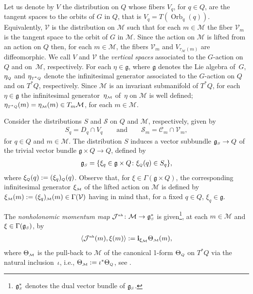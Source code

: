 \documentclass[10pt,a4paper]{amsart}
\numberwithin{equation}{section}
\def\M{\mathcal{M}}
\def\V{\mathcal{V}}
\def\S{\mathcal{S}}
\def\C{\mathcal{C}}
\def\g{\mathfrak{g}}
\def\nh{{\mbox{\tiny{nh}}}}
\def\subM{{\mbox{\tiny{$\M$}}}}
\def\subSS{{\mbox{\tiny{$S$}}}}
\def\subQQ{{\mbox{\tiny{$Q$}}}}
\begin{document}
Let us denote by $V$ the distribution on $Q$ whose f\/ibers $V_q$, for $q\in Q$, are the tangent
spaces to the orbits of $G$ in $Q$, that is $V_q = T(\operatorname{Orb}_q(q))$. Equivalently,
$\V$ is the distribution on $\M$ such that for each $m\in \M$ the f\/iber $\V_m$
is the tangent space to the orbit of $G$ in $\M$.
Since the action on $\M$ is lifted from an action on $Q$ then, for each $m\in \M$,
the f\/ibers $\V_m$ and $V_{\tau_\M(m)}$ are dif\/feomorphic. We call $V$ and $\V$
the {\it vertical spaces} associated to the $G$-action on~$Q$ and on~$\M$, respectively.
For each $\eta\in \mathfrak{g}$, where $\mathfrak{g}$ denotes the Lie algebra of~$G$,
$\eta_{\mbox{\tiny{$Q$}}}$ and $\eta_{\mbox{\tiny{$T^*Q$}}}$ denote the inf\/initesimal
generator associated to the $G$-action on $Q$ and on $T^*Q$, respectively.
Since $\M$ is an invariant submanifold of $T^*Q$, for each $\eta\in\g$ the
inf\/initesimal generator~$\eta_\subM$ of~$\eta$ on $\M$ is well def\/ined;  $\eta_{\mbox{\tiny{$T^*Q$}}} (m) = \eta_\subM (m) \in T_m\M$, for each $m\in\M$.

Consider the distributions $S$ and $\S$ on $Q$ and $\M$, respectively,
given by
\begin{gather*}
  S_q = D_q \cap V_q \qquad \mbox{and} \qquad \S_m = \C_m\cap\V_m,
\end{gather*}
for $q\in Q$ and $m\in \M$.
The distribution $S$
induces a vector subbundle  $\mathfrak{g}_\subSS \to Q$
of the trivial vector bundle $\mathfrak{g}\times Q \to Q$, def\/ined by
\begin{gather} \label{Def:S}
 \mathfrak{g}_\subSS = \{ \xi _q \in \mathfrak{g}\times Q \colon \xi_{\mbox{\tiny{$Q$}}}(q) \in S_q\},
 \end{gather}
where $\xi_\subQQ(q) := (\xi_q)_\subQQ (q)$.  Observe that, for
$\xi\in \Gamma(\mathfrak{g} \times Q)$, the corresponding inf\/initesimal generator
$\xi_\subM$ of the lifted action on $\M$ is def\/ined by
$\xi_\subM (m) := (\xi_q)_\subM(m)\in \Gamma(\V)$ having in mind that, for a f\/ixed $q\in Q$, $\xi_q\in\g$.

The {\it nonholonomic momentum map} \cite{BKMM} ${\mathcal J}^{\nh} \colon \M \to \mathfrak{g}_\subSS^*$
is given\footnote{$\mathfrak{g}^*_\subSS$ denotes the dual vector bundle of $\mathfrak{g}_\subSS$.},
at each $m \in \M$ and $\xi \in \Gamma(\mathfrak{g}_\subSS)$, by
\begin{gather}\label{Eq:NH-momentum}
\langle {\mathcal J}^{\nh}(m) , \xi (m) \rangle := {\bf i}_{\xi_\M} \Theta_\subM (m)  ,
\end{gather}
where $\Theta_\subM$ is the pull-back to $\M$ of the canonical 1-form
$\Theta_{\mbox{\tiny{$Q$}}}$ on $T^*Q$ via the natural inclu\-sion~$\iota$, i.e.,
$\Theta_\subM := \iota^*\Theta_{\mbox{\tiny{$Q$}}}$, see \cite{Paula, BKMM}.
\end{document}
